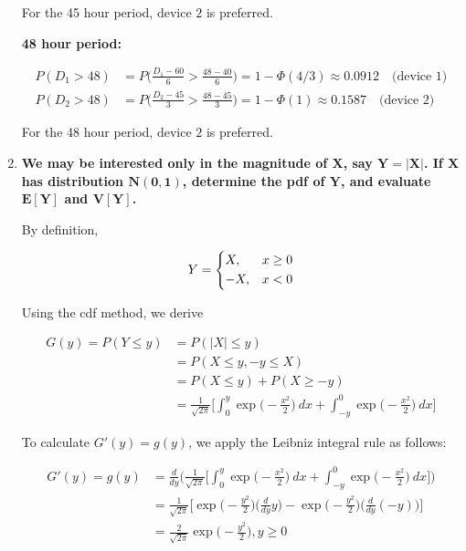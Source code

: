 \documentclass[10pt, oneside]{article}   	%
\theoremstyle{definition}
\begin{document}
\begin{enumerate}[label=9.\arabic*]
For the 45 hour period, $\boxed{\text{device 2}}$ is preferred.

\textbf{48 hour period:}

\begin{align*}
P(D_1 > 48) &= P \bigg( \frac{D_1-60}{6} > \frac{48-40}{6} \bigg) = 1 - \Phi(4/3) \approx \boxed{0.0912 \quad \text{(device 1)}} \\
P(D_2 > 48) &= P \bigg( \frac{D_2 - 45}{3} > \frac{48-45}{3} \bigg) = 1 - \Phi(1) \approx \boxed{0.1587 \quad \text{(device 2)}}
\end{align*}

For the 48 hour period, $\boxed{\text{device 2}}$ is preferred.

\item  \begin{tcolorbox}[
  colback=Cerulean!5!white,
  colframe=Cerulean!75!black]
\textbf{We may be interested only in the magnitude of $\bm{X}$, say $\bm{Y = |X|}$. If $\bm{X}$ has distribution $\bm{N(0,1)}$, determine the pdf of $\bm{Y}$, and evaluate $\bm{E[Y]}$ and $\bm{V[Y]}$.}
\end{tcolorbox}

By definition,

\[ 
Y = \begin{dcases}
X, & x \geq 0 \\
-X, & x < 0
\end{dcases}
\]

Using the cdf method, we derive

\begin{align*}
G(y) = P(Y \leq y) &= P(|X| \leq y) \\
&= P(X \leq y, -y \leq X) \\
&= P(X \leq y) + P(X \geq -y) \\
&= \frac{1}{\sqrt{2 \pi}} \bigg[ \int^y_0 \exp \bigg( -\frac{x^2}{2} \bigg) \ dx + \int^0_{-y} \exp \bigg( -\frac{x^2}{2} \bigg) \ dx \bigg] 
\end{align*}

To calculate $G'(y) = g(y)$, we apply the Leibniz integral rule as follows:

\begin{align*}
G'(y) = g(y) &= \frac{d}{dy} \bigg( \frac{1}{\sqrt{2 \pi}} \bigg[ \int^y_0 \exp \bigg( -\frac{x^2}{2} \bigg) \ dx + \int^0_{-y} \exp \bigg( -\frac{x^2}{2} \bigg) \ dx \bigg] \bigg) \\
&= \frac{1}{\sqrt{2 \pi}} \bigg[ \exp \bigg( -\frac{y^2}{2} \bigg) \bigg( \frac{d}{dy} y \bigg) - \exp \bigg( -\frac{y^2}{2} \bigg) \bigg( \frac{d}{dy} (-y) \bigg) \bigg] \\
&= \boxed{\frac{2}{\sqrt{2 \pi}} \exp \bigg( -\frac{y^2}{2} \bigg), y \geq 0}
\end{align*}


\end{enumerate}
\end{document}

